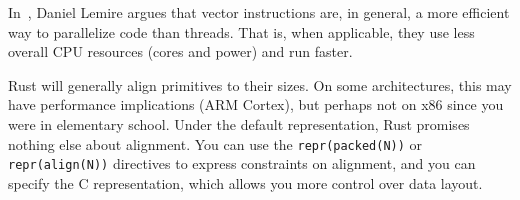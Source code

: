 In~\cite{lemire18:_multic_simd}, Daniel Lemire argues that vector
instructions are, in general, a more efficient way to parallelize code
than threads. That is, when applicable, they use less overall CPU
resources (cores and power) and run faster.


Rust will generally align primitives to their sizes. On some architectures, this may have performance implications (ARM Cortex), but perhaps not on x86 since you were in elementary school. Under the default representation, Rust promises nothing else about alignment. You can use the \texttt{repr(packed(N))} or \texttt{repr(align(N))} directives to express constraints on alignment, and you can specify the C representation, which allows you more control over data layout.



